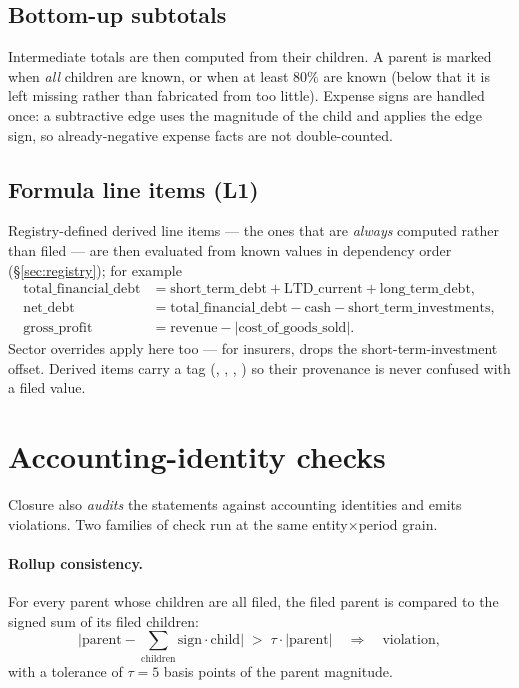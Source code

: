 \documentclass[11pt]{article}
\begin{document}
\subsection{Bottom-up subtotals}
Intermediate totals are then computed from their children. A parent is marked
 when \emph{all} children are known, or
 when at least $80\%$ are known (below that it is left
missing rather than fabricated from too little). Expense signs are handled once:
a subtractive edge uses the magnitude of the child and applies the edge sign, so
already-negative expense facts are not double-counted.

\subsection{Formula line items (L1)}
Registry-defined derived line items --- the ones that are \emph{always} computed
rather than filed --- are then evaluated from known values in dependency order
(\S\ref{sec:registry}); for example
\begin{align}
  \text{total\_financial\_debt} &= \text{short\_term\_debt}+\text{LTD\_current}+\text{long\_term\_debt}, \\
  \text{net\_debt} &= \text{total\_financial\_debt}-\text{cash}-\text{short\_term\_investments}, \\
  \text{gross\_profit} &= \text{revenue}-\lvert\text{cost\_of\_goods\_sold}\rvert .
\end{align}
Sector overrides apply here too --- for insurers,  drops the
short-term-investment offset. Derived items carry a  tag
(, , ,
) so their provenance is never confused with a filed value.

\section{Accounting-identity checks}
\label{sec:identities}
Closure also \emph{audits} the statements against accounting identities and emits
violations. Two families of check run at the same entity$\times$period grain.

\paragraph{Rollup consistency.} For every parent whose children are all filed, the
filed parent is compared to the signed sum of its filed children:
\begin{equation}
  \Big\lvert \text{parent} - \!\!\sum_{\text{children}}\!\! \text{sign}\cdot\text{child} \Big\rvert
  \;>\; \tau\cdot\lvert\text{parent}\rvert
  \quad\Rightarrow\quad \text{violation},
\end{equation}
with a tolerance of $\tau=5$ basis points of the parent magnitude.
\end{document}
